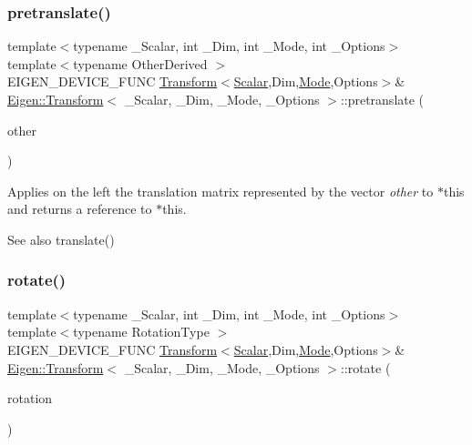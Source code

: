 \subsubsection{\texorpdfstring{pretranslate()}{pretranslate()}}
{\footnotesize\ttfamily template$<$typename \+\_\+\+Scalar, int \+\_\+\+Dim, int \+\_\+\+Mode, int \+\_\+\+Options$>$ \\
template$<$typename Other\+Derived $>$ \\
E\+I\+G\+E\+N\+\_\+\+D\+E\+V\+I\+C\+E\+\_\+\+F\+U\+NC \mbox{\hyperlink{class_eigen_1_1_transform}{Transform}}$<$\mbox{\hyperlink{class_eigen_1_1_transform_a4e69ced9d651745b8ed4eda46f41795d}{Scalar}},Dim,\mbox{\hyperlink{struct_mode}{Mode}},Options$>$\& \mbox{\hyperlink{class_eigen_1_1_transform}{Eigen\+::\+Transform}}$<$ \+\_\+\+Scalar, \+\_\+\+Dim, \+\_\+\+Mode, \+\_\+\+Options $>$\+::pretranslate (\begin{DoxyParamCaption}\item[{const \mbox{\hyperlink{class_eigen_1_1_matrix_base}{Matrix\+Base}}$<$ Other\+Derived $>$ \&}]{other }\end{DoxyParamCaption})}

Applies on the left the translation matrix represented by the vector {\itshape other} to {\ttfamily $\ast$this} and returns a reference to {\ttfamily $\ast$this}. \begin{DoxySeeAlso}{See also}
translate() 
\end{DoxySeeAlso}
\mbox{\label{class_eigen_1_1_transform_a805791cdc4ab236c1b878970e10865b6}} 
\subsubsection{\texorpdfstring{rotate()}{rotate()}}
{\footnotesize\ttfamily template$<$typename \+\_\+\+Scalar, int \+\_\+\+Dim, int \+\_\+\+Mode, int \+\_\+\+Options$>$ \\
template$<$typename Rotation\+Type $>$ \\
E\+I\+G\+E\+N\+\_\+\+D\+E\+V\+I\+C\+E\+\_\+\+F\+U\+NC \mbox{\hyperlink{class_eigen_1_1_transform}{Transform}}$<$\mbox{\hyperlink{class_eigen_1_1_transform_a4e69ced9d651745b8ed4eda46f41795d}{Scalar}},Dim,\mbox{\hyperlink{struct_mode}{Mode}},Options$>$\& \mbox{\hyperlink{class_eigen_1_1_transform}{Eigen\+::\+Transform}}$<$ \+\_\+\+Scalar, \+\_\+\+Dim, \+\_\+\+Mode, \+\_\+\+Options $>$\+::rotate (\begin{DoxyParamCaption}\item[{const Rotation\+Type \&}]{rotation }\end{DoxyParamCaption})}

